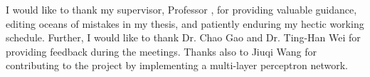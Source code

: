 \begin{acknowledgements}
    I would like to thank my supervisor, Professor \supname, for providing valuable guidance, editing oceans of mistakes in my thesis, and patiently enduring my hectic working schedule.
    Further, I would like to thank Dr. Chao Gao and Dr. Ting-Han Wei for providing feedback during the meetings.
    Thanks also to Jiuqi Wang for contributing to the project by implementing a multi-layer perceptron network.
\end{acknowledgements}